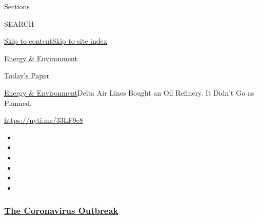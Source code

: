 Sections

SEARCH

\protect\hyperlink{site-content}{Skip to
content}\protect\hyperlink{site-index}{Skip to site index}

\href{https://www.nytimes3xbfgragh.onion/section/business/energy-environment}{Energy
\& Environment}

\href{https://myaccount.nytimes3xbfgragh.onion/auth/login?response_type=cookie\&client_id=vi}{}

\href{https://www.nytimes3xbfgragh.onion/section/todayspaper}{Today's
Paper}

\href{/section/business/energy-environment}{Energy \&
Environment}\textbar{}Delta Air Lines Bought an Oil Refinery. It Didn't
Go as Planned.

\url{https://nyti.ms/33LF9c8}

\begin{itemize}
\item
\item
\item
\item
\item
\item
\end{itemize}

\hypertarget{the-coronavirus-outbreak}{%
\subsubsection{\texorpdfstring{\href{https://www.nytimes3xbfgragh.onion/news-event/coronavirus?name=styln-coronavirus-markets\&region=TOP_BANNER\&variant=undefined\&block=storyline_menu_recirc\&action=click\&pgtype=Article\&impression_id=1354e360-e384-11ea-99fe-1fe62c0779f3}{The
Coronavirus
Outbreak}}{The Coronavirus Outbreak}}\label{the-coronavirus-outbreak}}

